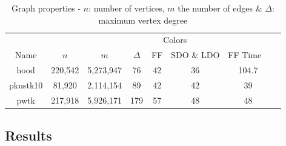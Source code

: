 \documentclass[preprint]{sigplanconf}
\begin{document}
%



\begin{table}[!ht]
\scriptsize
\begin{tabular}{c c c c c c c c }
\hline
  &   &  &  \multicolumn{3}{c}{Colors} &  \\
Name & $n$ & $m$ & $\Delta$ & FF & SDO $\&$ LDO & FF Time \
\\
\hline
hood & 220,542 & 5,273,947 & 76 & 42 & 36 & 104.7\\
pkustk10 & 81,920 & 2,114,154 & 89 & 42 & 42 & 39\\
pwtk & 217,918 & 5,926,171 & 179 & 57 & 48 & 48\\
\end{tabular}
\caption{Graph properties - $n$: number of vertices, $m$ the number of edges $\&$ $\Delta$: maximum vertex degree}
\label{tbl:properties}
\end{table}




\subsection{Results}
\end{document}
